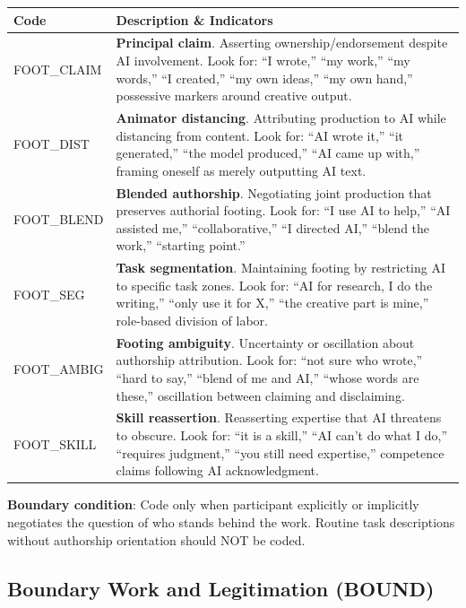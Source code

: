 \documentclass[11pt]{article}
\begin{document}
\begin{tcolorbox}[colback=footingcolor!10, colframe=footingcolor!80, title=\textbf{FOOT: Footing and Authorship Codes}, fonttitle=\bfseries\sffamily]
\vspace{0.5em}
\begin{tabular}{@{}p{3.5cm}p{10cm}@{}}
\toprule
\textbf{Code} & \textbf{Description \& Indicators} \\
\midrule
FOOT\_CLAIM & \textbf{Principal claim}. Asserting ownership/endorsement despite AI involvement. Look for: ``I wrote,'' ``my work,'' ``my words,'' ``I created,'' ``my own ideas,'' ``my own hand,'' possessive markers around creative output. \\[0.5em]
FOOT\_DIST & \textbf{Animator distancing}. Attributing production to AI while distancing from content. Look for: ``AI wrote it,'' ``it generated,'' ``the model produced,'' ``AI came up with,'' framing oneself as merely outputting AI text. \\[0.5em]
FOOT\_BLEND & \textbf{Blended authorship}. Negotiating joint production that preserves authorial footing. Look for: ``I use AI to help,'' ``AI assisted me,'' ``collaborative,'' ``I directed AI,'' ``blend the work,'' ``starting point.'' \\[0.5em]
FOOT\_SEG & \textbf{Task segmentation}. Maintaining footing by restricting AI to specific task zones. Look for: ``AI for research, I do the writing,'' ``only use it for X,'' ``the creative part is mine,'' role-based division of labor. \\[0.5em]
FOOT\_AMBIG & \textbf{Footing ambiguity}. Uncertainty or oscillation about authorship attribution. Look for: ``not sure who wrote,'' ``hard to say,'' ``blend of me and AI,'' ``whose words are these,'' oscillation between claiming and disclaiming. \\[0.5em]
FOOT\_SKILL & \textbf{Skill reassertion}. Reasserting expertise that AI threatens to obscure. Look for: ``it is a skill,'' ``AI can't do what I do,'' ``requires judgment,'' ``you still need expertise,'' competence claims following AI acknowledgment. \\
\bottomrule
\end{tabular}

\vspace{0.5em}
\textbf{Boundary condition}: Code only when participant explicitly or implicitly negotiates the question of who stands behind the work. Routine task descriptions without authorship orientation should NOT be coded.
\end{tcolorbox}

\newpage
\subsection{Boundary Work and Legitimation (BOUND)}
\end{document}
